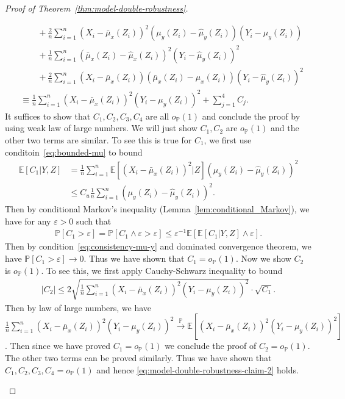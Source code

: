 \documentclass[12pt]{article}
\theoremstyle{definition}
\def\P{\mathbb{P}}
\def\P{\mathbb{P}}
\newcommand{\E}{\mathbb E}								%
\renewcommand{\P}{\mathbb{P}}							%
\newcommand{\convp}{\overset{\mathbb{P}}{\rightarrow}}             %
\newcommand{\srx}{X}									%
\newcommand{\srz}{Z}									%
\newcommand{\sry}{Y}									%
\begin{document}
\begin{proof}[Proof of Theorem~\ref{thm:model-double-robustness}]
\begin{itemize}
\begin{align*}
			&
			\qquad+\frac{2}{n}\sum_{i=1}^n (\srx_i-\bar\mu_x(\srz_i))^2(\mu_y(\srz_i)-\widehat{\mu}_y(\srz_i))(\sry_i-\mu_y(\srz_i))\\
			&
			\qquad+\frac{1}{n}\sum_{i=1}^n (\bar \mu_x(\srz_i)-\widehat{\mu}_x(\srz_i))^2(\sry_i-\widehat\mu_y(\srz_i))^2\\
			&
			\qquad+\frac{2}{n}\sum_{i=1}^n (\srx_i-\bar\mu_x(\srz_i))(\bar \mu_x(\srz_i)-\widehat{\mu}_x(\srz_i))(\sry_i-\widehat\mu_y(\srz_i))^2\\
			&
			\equiv \frac{1}{n}\sum_{i=1}^n (\srx_i-\bar\mu_x(\srz_i))^2(\sry_i-\mu_y(\srz_i))^2+\sum_{j=1}^4C_j.
		\end{align*}
		It suffices to show that $C_1,C_2,C_3,C_4$ are all $o_\P(1)$ and conclude the proof by using weak law of large numbers. We will just show $C_1,C_2$ are $o_\P(1)$ and the other two terms are similar. To see this is true for $C_1$, we first use conditoin~\eqref{eq:bounded-mu} to bound
		\begin{align*}
			\E[C_1|\sry,\srz]
			&
			=\frac{1}{n}\sum_{i=1}^n \E[(\srx_i-\bar\mu_x(\srz_i))^2|\srz](\mu_y(\srz_i)-\widehat{\mu}_y(\srz_i))^2\\
			&
			\leq C_u\frac{1}{n}\sum_{i=1}^n(\mu_y(\srz_i)-\widehat{\mu}_y(\srz_i))^2.
		\end{align*}
		Then by conditional Markov's inequality (Lemma~\ref{lem:conditional_Markov}), we have for any $\varepsilon>0$ such that
		\begin{align*}
		    \P[C_1>\varepsilon]=\P[C_1\wedge \varepsilon>\varepsilon]\leq \varepsilon^{-1}\E[\E[C_1|\sry,\srz]\wedge\varepsilon].
	    \end{align*}
		Then by condition~\eqref{eq:consistency-mu-y} and dominated convergence theorem, we have $\P[C_1>\varepsilon]\rightarrow0$. Thus we have shown that $C_1=o_\P(1)$. Now we show $C_2$ is $o_\P(1)$. To see this, we first apply Cauchy-Schwarz inequality to bound 
		\begin{align*}
			|C_2|\leq 2\sqrt{\frac{1}{n}\sum_{i=1}^n (\srx_i-\bar\mu_x(\srz_i))^2(\sry_i-\mu_y(\srz_i))^2}\cdot \sqrt{C_1}.
		\end{align*}
		Then by law of large numbers, we have $\frac{1}{n}\sum_{i=1}^n (\srx_i-\bar\mu_x(\srz_i))^2(\sry_i-\mu_y(\srz_i))^2\convp \E[(\srx_i-\bar\mu_x(\srz_i))^2(\sry_i-\mu_y(\srz_i))^2]$. Then since we have proved $C_1=o_\P(1)$ we conclude the proof of $C_2=o_\P(1)$. The other two terms can be proved similarly. Thus we have shown that $C_1,C_2,C_3,C_4=o_\P(1)$ and hence \eqref{eq:model-double-robustness-claim-2} holds.
	\end{itemize}
\end{proof}
\end{document}
